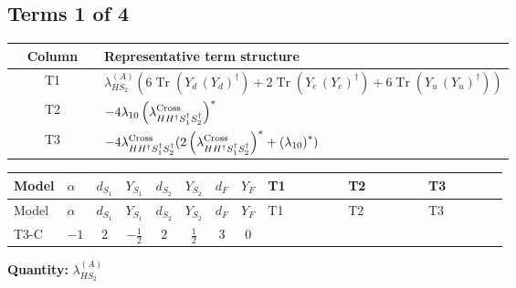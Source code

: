 \documentclass[8pt]{article}
\begin{document}
\begin{landscape}
\subsection*{Terms 1 of 4}
\begin{center}
\begin{tabular}{@{}c >{\raggedright\arraybackslash}p{0.82\linewidth}@{}}
\toprule
Column & Representative term structure \\
\midrule
T1 & \(\displaystyle {\lambda_{HS_2}^{(A)}} (6 \operatorname{Tr}\!\left({Y_d}\,\left({Y_d}\right)^{\dagger}\right)+2 \operatorname{Tr}\!\left({Y_e}\,\left({Y_e}\right)^{\dagger}\right)+6 \operatorname{Tr}\!\left({Y_u}\,\left({Y_u}\right)^{\dagger}\right))\) \\
\midrule
T2 & \(\displaystyle -4 {\lambda_{10}} \left({\lambda_{H H^\dagger S_1^\dagger S_2^\dagger}^{\rm Cross}}\right)^{*}\) \\
\midrule
T3 & \(\displaystyle -4 {\lambda_{H H^\dagger S_1^\dagger S_2^\dagger}^{\rm Cross}} (2 \left({\lambda_{H H^\dagger S_1^\dagger S_2^\dagger}^{\rm Cross}}\right)^{*}+\left({\lambda_{10}}\right)^{*})\) \\
\midrule
\bottomrule
\end{tabular}
\end{center}
\smallskip
\tiny
\begin{longtable}{@{}llcccccc >{\raggedright\arraybackslash}p{0.21\linewidth} >{\raggedright\arraybackslash}p{0.21\linewidth} >{\raggedright\arraybackslash}p{0.21\linewidth}@{}}
\toprule
Model & $\alpha$ & $d_{S_1}$ & $Y_{S_1}$ & $d_{S_2}$ & $Y_{S_2}$ & $d_F$ & $Y_F$ & T1 & T2 & T3 \\
\midrule
\endfirsthead
\toprule
Model & $\alpha$ & $d_{S_1}$ & $Y_{S_1}$ & $d_{S_2}$ & $Y_{S_2}$ & $d_F$ & $Y_F$ & T1 & T2 & T3 \\
\midrule
\endhead
T3-C & $-1$ & $2$ & $-\frac{1}{2}$ & $2$ & $\frac{1}{2}$ & $3$ & $0$ & \scriptsize\adjustbox{max width=\linewidth}{$\begin{gathered} {\lambda_{HS_2}^{(A)}} (6 \operatorname{Tr}\!\left({Y_d}\,\left({Y_d}\right)^{\dagger}\right)+2 \operatorname{Tr}\!\left({Y_e}\,\left({Y_e}\right)^{\dagger}\right)+6 \operatorname{Tr}\!\left({Y_u}\,\left({Y_u}\right)^{\dagger}\right))\end{gathered}$} & \scriptsize\adjustbox{max width=\linewidth}{$\begin{gathered} -4 {\lambda_{10}} \left({\lambda_{H H^\dagger S_1^\dagger S_2^\dagger}^{\rm Cross}}\right)^{*}\end{gathered}$} & \scriptsize\adjustbox{max width=\linewidth}{$\begin{gathered} -4 {\lambda_{H H^\dagger S_1^\dagger S_2^\dagger}^{\rm Cross}} (2 \left({\lambda_{H H^\dagger S_1^\dagger S_2^\dagger}^{\rm Cross}}\right)^{*}+\left({\lambda_{10}}\right)^{*})\end{gathered}$} \\
\midrule
\bottomrule
\end{longtable}
\clearpage
\noindent\textbf{Quantity: }$\lambda_{HS_2}^{(A)}$\par\smallskip

\end{landscape}
\end{document}
